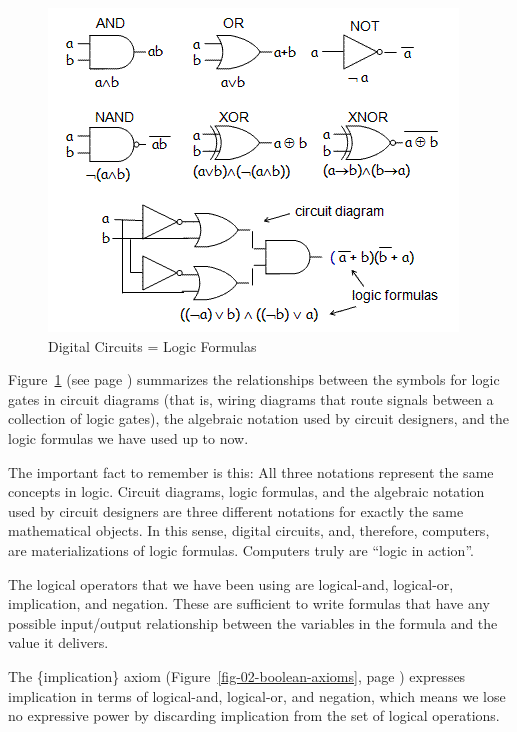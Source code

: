 \begin{figure}
\begin{center}
\includegraphics[scale=0.7]{Resources/LogicGates.png}
\end{center}
\caption{Digital Circuits = Logic Formulas}
\label{fig-02-logic-gates}
\end{figure}

Figure~\ref{fig-02-logic-gates} (see page \pageref{fig-02-logic-gates})
summarizes the relationships between
the symbols for logic gates in circuit diagrams (that is,
wiring diagrams that route signals between a collection of logic gates),
the algebraic notation used by circuit designers,
and the logic formulas we have used up to now.

The important fact to remember is this: All three notations
represent the same concepts in logic. Circuit diagrams, logic formulas,
and the algebraic notation used by circuit designers are three
different notations for exactly the same mathematical objects.
In this sense, digital circuits, and, therefore, computers,
are materializations of logic formulas. Computers truly are
``logic in action''.

The logical operators that we have been using are
logical-and, logical-or, implication, and negation.
These are sufficient to write formulas that have
any possible input/output relationship between the
variables in the formula and the value it delivers.

The \{implication\} axiom
(Figure~\ref{fig-02-boolean-axioms}, page \pageref{fig-02-boolean-axioms})
expresses implication in terms of logical-and, logical-or,
and negation, which means we lose no expressive power by
discarding implication from the set of logical operations.


